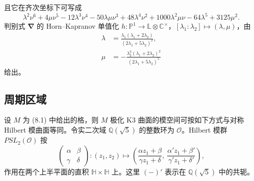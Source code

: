 

\noindent 且它在齐次坐标下可写成
\begin{equation}
  \lambda^{2}\nu^{6}+4\mu\nu^{5}-12\lambda^{3}\nu^{4}-50\lambda\mu\nu^{3}
  +48\lambda^{4}\nu^{2}+1000\lambda^{2}\mu\nu-64\lambda^{5}+3125\mu^{2}. \tag{8.11}
\end{equation}
判别式 $\boldsymbol{\nabla}$ 的 Horn–Kapranov 单值化
$h\colon\mathbb{P}^{1}\to\mathbb{L}\otimes\mathbb{C}^{\times}$，$[\lambda_{1}:\lambda_{2}]\mapsto(\lambda,\mu)$，由
\begin{align}
  \lambda&=\frac{\lambda_{1}(\lambda_{1}+2\lambda_{2})}{(2\lambda_{1}+5\lambda_{2})^{2}}, \tag{8.12}\\
  \mu&=-\frac{\lambda_{2}^{3}(\lambda_{1}+2\lambda_{2})^{2}}{(2\lambda_{1}+5\lambda_{2})^{5}} \tag{8.13}
\end{align}
给出。

\subsection{周期区域}

设 $M$ 为 (8.1) 中给出的格，则 $M$ 极化 K3 曲面的模空间可按如下方式与对称 Hilbert 模曲面等同。令实二次域 $\mathbb{Q}(\sqrt{5})$ 的整数环为 $\mathcal{O}$。Hilbert 模群 $PSL_{2}(\mathcal{O})$ 按
\begin{equation}
  \begin{pmatrix}\alpha&\beta\\ \gamma&\delta\end{pmatrix}\colon
  (z_{1},z_{2})\mapsto
  \left(\frac{\alpha z_{1}+\beta}{\gamma z_{1}+\delta},\
        \frac{\alpha' z_{1}+\beta'}{\gamma' z_{1}+\delta'}\right), \tag{8.14}
\end{equation}
作用在两个上半平面的直积 $\mathbb{H}\times\mathbb{H}$ 上。这里 $(-)'$ 表示在 $\mathbb{Q}(\sqrt{5})$ 中的共轭。

